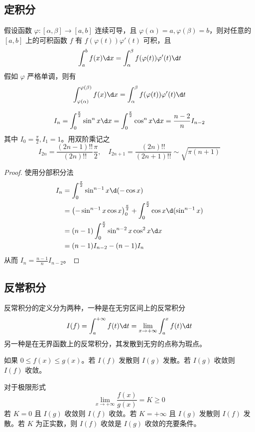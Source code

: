 \subsection{定积分}

\begin{theorem}
	假设函数 $\varphi : [\alpha, \beta] \to [a, b]$ 连续可导，且 $\varphi(\alpha) = a, \varphi(\beta) = b$，则对任意的 $[a, b]$ 上的可积函数 $f$ 有 $f(\varphi(t))\varphi'(t)$ 可积，且
	\[ \int_{a}^{b} f(x) \d x = \int_{\alpha}^{\beta} f(\varphi(t)) \varphi'(t) \d t \]
	假如 $\varphi$ 严格单调，则有
	\[ \int_{\varphi(\alpha)}^{\varphi(\beta)} f(x) \d x = \int_{\alpha}^{\beta} f(\varphi(t)) \varphi'(t) \d t \]

\end{theorem}

\begin{theorem}[Wallis 公式]
	\[ I_n = \int_{0}^{\frac{\pi}{2}} \sin^n x \d x = \int_{0}^{\frac{\pi}{2}} \cos^n x \d x = \frac{n-2}{n}I_{n-2} \]
	其中 $I_0 = \frac{\pi}{2}, I_1 = 1$。用双阶乘记之
	\[ I_{2n}=\frac{(2n-1)!!}{(2n)!!}\frac{\pi}{2}, \quad I_{2n+1}=\frac{(2n)!!}{(2n+1)!!} \sim \sqrt{\pi (n+1)} \]
\end{theorem}

\begin{proof}
	使用分部积分法
	\[ \begin{aligned}
			I_n & = \int_{0}^{\frac{\pi}{2}} \sin^{n-1} x \d (-\cos x)                                                      \\
			    & = \left(-\sin^{n-1} x \cos x\right)_0^{\frac{\pi}{2}} + \int_{0}^{\frac{\pi}{2}} \cos x \d (\sin^{n-1} x) \\
			    & = (n-1) \int_{0}^{\frac{\pi}{2}} \sin^{n-2} x \cos^2 x \d x                                               \\
			    & = (n-1) I_{n-2} - (n-1)I_n
		\end{aligned} \]
	从而 $I_n = \frac{n-1}{n} I_{n-2}$。
\end{proof}

\subsection{反常积分}

反常积分的定义分为两种，一种是在无穷区间上的反常积分
\[ I(f) = \int_{a}^{+\infty} f(t) \d t = \lim_{x \to +\infty} \int_{a}^{x} f(t) \d t \]
另一种是在无界函数上的反常积分，其发散到无穷的点称为瑕点。

\begin{theorem}[比较判别法]
	如果 $0 \leqslant f(x) \leqslant g(x)$。若 $I(f)$ 发散则 $I(g)$ 发散。若 $I(g)$ 收敛则 $I(f)$ 收敛。

	对于极限形式
	\[ \lim_{x \to +\infty} \frac{f(x)}{g(x)} = K \geqslant 0 \]
	若 $K = 0$ 且 $I(g)$ 收敛则 $I(f)$ 收敛。若 $K = +\infty$ 且 $I(g)$ 发散则 $I(f)$ 发散。若 $K$ 为正实数，则 $I(f)$ 收敛是 $I(g)$ 收敛的充要条件。
\end{theorem}

